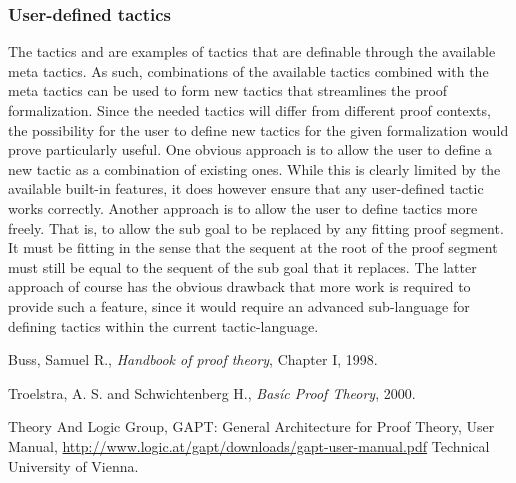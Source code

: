 \documentclass{article}
\newcommand{\cli}[1]{{\ttfamily {#1}}}
\begin{document}
\subsubsection*{User-defined tactics}
The tactics \cli{destruct} and \cli{decompose} are examples of tactics that are definable through the available meta tactics. As such, combinations of the available tactics combined with the meta tactics can be used to form new tactics that streamlines the proof formalization. Since the needed tactics will differ from different proof contexts, the possibility for the user to define new tactics for the given formalization would prove particularly useful. One obvious approach is to allow the user to define a new tactic as a combination of existing ones. While this is clearly limited by the available built-in features, it does however ensure that any user-defined tactic works correctly. Another approach is to allow the user to define tactics more freely. That is, to allow the sub goal to be replaced by any fitting proof segment. It must be fitting in the sense that the sequent at the root of the proof segment must still be equal to the sequent of the sub goal that it replaces. The latter approach of course has the obvious drawback that more work is required to provide such a feature, since it would require an advanced sub-language for defining tactics within the current tactic-language.

\begin{thebibliography}{9}

  Buss, Samuel R.,
  \emph{Handbook of proof theory}, Chapter I,
  1998.

 Troelstra, A. S. and Schwichtenberg H.,
 \emph{Basíc Proof Theory},
 2000.

Theory And Logic Group,
GAPT: General Architecture for Proof Theory, User Manual,
\url{http://www.logic.at/gapt/downloads/gapt-user-manual.pdf}
Technical University of Vienna.

\end{thebibliography}
\end{document}

